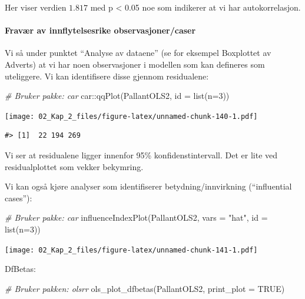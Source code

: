 \documentclass[
]{article}
\newenvironment{Shaded}{\begin{snugshade}}{\end{snugshade}}
\newcommand{\AttributeTok}[1]{\textcolor[rgb]{0.77,0.63,0.00}{#1}}
\newcommand{\CommentTok}[1]{\textcolor[rgb]{0.56,0.35,0.01}{\textit{#1}}}
\newcommand{\ConstantTok}[1]{\textcolor[rgb]{0.00,0.00,0.00}{#1}}
\newcommand{\DecValTok}[1]{\textcolor[rgb]{0.00,0.00,0.81}{#1}}
\newcommand{\FunctionTok}[1]{\textcolor[rgb]{0.00,0.00,0.00}{#1}}
\newcommand{\NormalTok}[1]{#1}
\newcommand{\SpecialCharTok}[1]{\textcolor[rgb]{0.00,0.00,0.00}{#1}}
\newcommand{\StringTok}[1]{\textcolor[rgb]{0.31,0.60,0.02}{#1}}
\begin{document}
Her viser verdien \(1.817\) med p \textless{} 0.05 noe som indikerer at vi har autokorrelasjon.

\hypertarget{fravuxe6r-av-innflytelsesrike-observasjonercaser-2}{%
\paragraph{Fravær av innflytelsesrike observasjoner/caser}\label{fravuxe6r-av-innflytelsesrike-observasjonercaser-2}}

Vi så under punktet ``Analyse av dataene'' (se for eksempel Boxplottet av Adverts) at vi har noen observasjoner i modellen som kan defineres som uteliggere. Vi kan identifisere disse gjennom residualene:

\begin{Shaded}
\begin{Highlighting}[]
\CommentTok{\# Bruker pakke: car}
\NormalTok{car}\SpecialCharTok{::}\FunctionTok{qqPlot}\NormalTok{(PallantOLS2, }\AttributeTok{id =} \FunctionTok{list}\NormalTok{(}\AttributeTok{n=}\DecValTok{3}\NormalTok{))}
\end{Highlighting}
\end{Shaded}

\texttt{[image: 02\_Kap\_2\_files/figure-latex/unnamed-chunk-140-1.pdf]}

\begin{verbatim}
#> [1]  22 194 269
\end{verbatim}

Vi ser at residualene ligger innenfor 95\% konfidenstintervall. Det er lite ved residualplottet som vekker bekymring.

Vi kan også kjøre analyser som identifiserer betydning/innvirkning (``influential cases''):

\begin{Shaded}
\begin{Highlighting}[]
\CommentTok{\# Bruker pakke: car}
\FunctionTok{influenceIndexPlot}\NormalTok{(PallantOLS2, }\AttributeTok{vars =} \StringTok{"hat"}\NormalTok{, }\AttributeTok{id =} \FunctionTok{list}\NormalTok{(}\AttributeTok{n=}\DecValTok{3}\NormalTok{))}
\end{Highlighting}
\end{Shaded}

\texttt{[image: 02\_Kap\_2\_files/figure-latex/unnamed-chunk-141-1.pdf]}

DfBetas:

\begin{Shaded}
\begin{Highlighting}[]
\CommentTok{\# Bruker pakken: olsrr}
\FunctionTok{ols\_plot\_dfbetas}\NormalTok{(PallantOLS2, }\AttributeTok{print\_plot =} \ConstantTok{TRUE}\NormalTok{)}
\end{Highlighting}
\end{Shaded}
\end{document}
